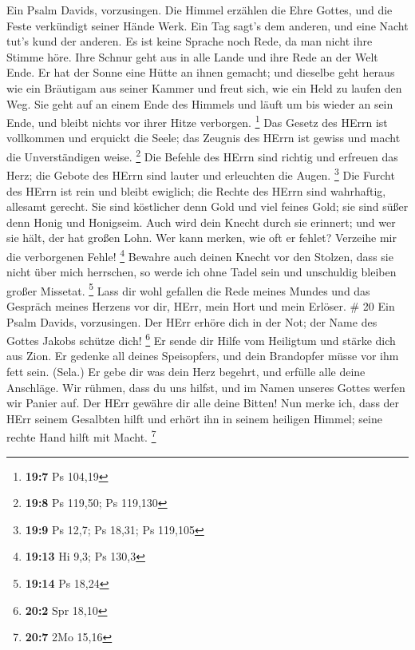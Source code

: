  Ein Psalm Davids, vorzusingen.  Die Himmel
erzählen die Ehre Gottes, und die Feste verkündigt seiner Hände Werk.
 Ein Tag sagt's dem anderen, und eine Nacht tut's kund der
anderen.  Es ist keine Sprache noch Rede, da man nicht ihre
Stimme höre.  Ihre Schnur geht aus in alle Lande und ihre
Rede an der Welt Ende. Er hat der Sonne eine Hütte an ihnen gemacht;
 und dieselbe geht heraus wie ein Bräutigam aus seiner
Kammer und freut sich, wie ein Held zu laufen den Weg.  Sie
geht auf an einem Ende des Himmels und läuft um bis wieder an sein Ende,
und bleibt nichts vor ihrer Hitze verborgen. \footnote{\textbf{19:7} Ps
  104,19}  Das Gesetz des HErrn ist vollkommen und erquickt
die Seele; das Zeugnis des HErrn ist gewiss und macht die Unverständigen
weise. \footnote{\textbf{19:8} Ps 119,50; Ps 119,130}  Die
Befehle des HErrn sind richtig und erfreuen das Herz; die Gebote des
HErrn sind lauter und erleuchten die Augen. \footnote{\textbf{19:9} Ps
  12,7; Ps 18,31; Ps 119,105}  Die Furcht des HErrn ist
rein und bleibt ewiglich; die Rechte des HErrn sind wahrhaftig, allesamt
gerecht.  Sie sind köstlicher denn Gold und viel feines
Gold; sie sind süßer denn Honig und Honigseim.  Auch wird
dein Knecht durch sie erinnert; und wer sie hält, der hat großen Lohn.
 Wer kann merken, wie oft er fehlet? Verzeihe mir die
verborgenen Fehle! \footnote{\textbf{19:13} Hi 9,3; Ps 130,3}
 Bewahre auch deinen Knecht vor den Stolzen, dass sie nicht
über mich herrschen, so werde ich ohne Tadel sein und unschuldig bleiben
großer Missetat. \footnote{\textbf{19:14} Ps 18,24}  Lass
dir wohl gefallen die Rede meines Mundes und das Gespräch meines Herzens
vor dir, HErr, mein Hort und mein Erlöser. \# 20  Ein Psalm
Davids, vorzusingen.  Der HErr erhöre dich in der Not; der
Name des Gottes Jakobs schütze dich! \footnote{\textbf{20:2} Spr 18,10}
 Er sende dir Hilfe vom Heiligtum und stärke dich aus Zion.
 Er gedenke all deines Speisopfers, und dein Brandopfer
müsse vor ihm fett sein. (Sela.)  Er gebe dir was dein Herz
begehrt, und erfülle alle deine Anschläge.  Wir rühmen, dass
du uns hilfst, und im Namen unseres Gottes werfen wir Panier auf. Der
HErr gewähre dir alle deine Bitten!  Nun merke ich, dass der
HErr seinem Gesalbten hilft und erhört ihn in seinem heiligen Himmel;
seine rechte Hand hilft mit Macht. \footnote{\textbf{20:7} 2Mo 15,16}
